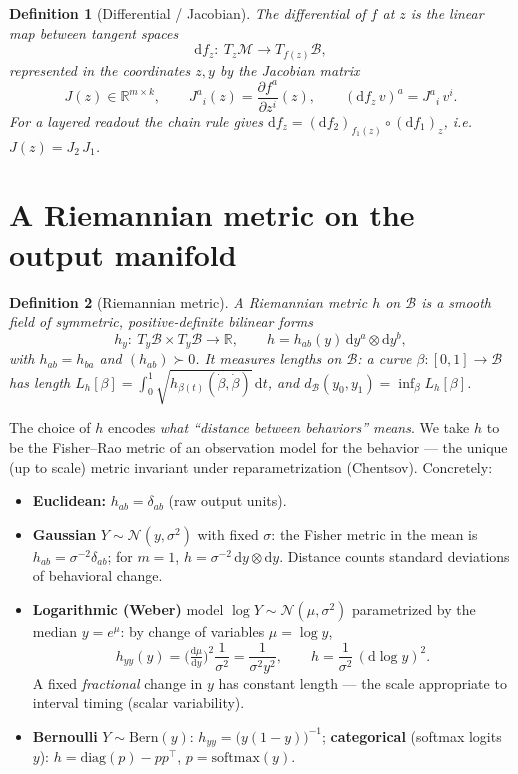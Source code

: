 \documentclass[11pt]{article}
\newtheorem{definition}{Definition}
\newcommand{\M}{\mathcal{M}}
\newcommand{\B}{\mathcal{B}}
\newcommand{\T}{T}
\newcommand{\R}{\mathbb{R}}
\newcommand{\dd}{\mathrm{d}}
\begin{document}
\begin{definition}[Differential / Jacobian]
The differential of $f$ at $z$ is the linear map between tangent spaces
\[
  \dd f_{z}:\ \T_{z}\M\longrightarrow \T_{f(z)}\B ,
\]
represented in the coordinates $z,y$ by the Jacobian matrix
\[
  J(z)\in\R^{m\times k},\qquad J^{a}{}_{i}(z)=\frac{\partial f^{a}}{\partial z^{i}}(z),
  \qquad (\dd f_{z}\,v)^{a}=J^{a}{}_{i}\,v^{i}.
\]
For a layered readout the chain rule gives $\dd f_{z}=(\dd f_{2})_{f_1(z)}\circ(\dd f_{1})_{z}$,
i.e.\ $J(z)=J_{2}\,J_{1}$.
\end{definition}

\section{A Riemannian metric on the output manifold}\label{sec:outmetric}

\begin{definition}[Riemannian metric]
A \emph{Riemannian metric} $h$ on $\B$ is a smooth field of symmetric, positive-definite
bilinear forms
\[
  h_{y}:\ \T_{y}\B\times \T_{y}\B\to\R ,\qquad
  h = h_{ab}(y)\,\dd y^{a}\otimes \dd y^{b},
\]
with $h_{ab}=h_{ba}$ and $(h_{ab})\succ0$. It measures lengths on $\B$: a curve
$\beta:[0,1]\to\B$ has length $L_{h}[\beta]=\int_{0}^{1}\!\sqrt{h_{\beta(t)}(\dot\beta,\dot\beta)}\,\dd t$,
and $d_{\B}(y_{0},y_{1})=\inf_{\beta}L_{h}[\beta]$.
\end{definition}

The choice of $h$ encodes \emph{what ``distance between behaviors'' means}. We take $h$ to be
the Fisher--Rao metric of an observation model for the behavior --- the unique (up to scale)
metric invariant under reparametrization (Chentsov). Concretely:

\begin{itemize}
\item \textbf{Euclidean:} $h_{ab}=\delta_{ab}$ (raw output units).
\item \textbf{Gaussian} $Y\sim\mathcal N(y,\sigma^{2})$ with fixed $\sigma$: the Fisher metric
      in the mean is $h_{ab}=\sigma^{-2}\delta_{ab}$; for $m=1$, $h=\sigma^{-2}\,\dd y\otimes\dd y$.
      Distance counts standard deviations of behavioral change.
\item \textbf{Logarithmic (Weber)} model $\log Y\sim\mathcal N(\mu,\sigma^{2})$ parametrized by
      the median $y=e^{\mu}$: by change of variables $\mu=\log y$,
      \[
        h_{yy}(y)=\Big(\tfrac{\dd\mu}{\dd y}\Big)^{2}\frac1{\sigma^{2}}
                 =\frac{1}{\sigma^{2}y^{2}},\qquad
        h=\frac{1}{\sigma^{2}}\,(\dd\log y)^{2}.
      \]
      A fixed \emph{fractional} change in $y$ has constant length --- the scale appropriate to
      interval timing (scalar variability).
\item \textbf{Bernoulli} $Y\sim\mathrm{Bern}(y)$: $h_{yy}=\big(y(1-y)\big)^{-1}$;
      \textbf{categorical} (softmax logits $y$): $h=\mathrm{diag}(p)-pp^{\top}$, $p=\mathrm{softmax}(y)$.
\end{itemize}
\end{document}

